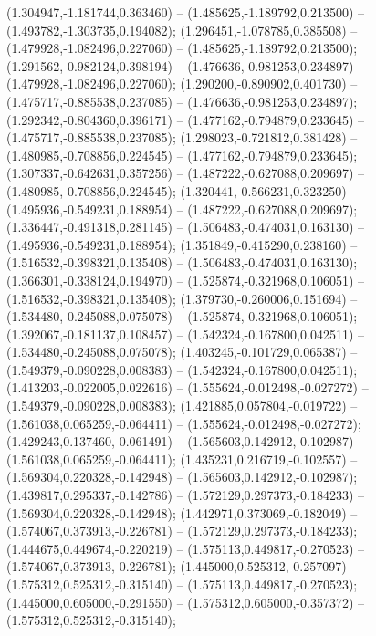  (1.304947,-1.181744,0.363460) -- (1.485625,-1.189792,0.213500) -- (1.493782,-1.303735,0.194082);
 (1.296451,-1.078785,0.385508) -- (1.479928,-1.082496,0.227060) -- (1.485625,-1.189792,0.213500);
 (1.291562,-0.982124,0.398194) -- (1.476636,-0.981253,0.234897) -- (1.479928,-1.082496,0.227060);
 (1.290200,-0.890902,0.401730) -- (1.475717,-0.885538,0.237085) -- (1.476636,-0.981253,0.234897);
 (1.292342,-0.804360,0.396171) -- (1.477162,-0.794879,0.233645) -- (1.475717,-0.885538,0.237085);
 (1.298023,-0.721812,0.381428) -- (1.480985,-0.708856,0.224545) -- (1.477162,-0.794879,0.233645);
 (1.307337,-0.642631,0.357256) -- (1.487222,-0.627088,0.209697) -- (1.480985,-0.708856,0.224545);
 (1.320441,-0.566231,0.323250) -- (1.495936,-0.549231,0.188954) -- (1.487222,-0.627088,0.209697);
 (1.336447,-0.491318,0.281145) -- (1.506483,-0.474031,0.163130) -- (1.495936,-0.549231,0.188954);
 (1.351849,-0.415290,0.238160) -- (1.516532,-0.398321,0.135408) -- (1.506483,-0.474031,0.163130);
 (1.366301,-0.338124,0.194970) -- (1.525874,-0.321968,0.106051) -- (1.516532,-0.398321,0.135408);
 (1.379730,-0.260006,0.151694) -- (1.534480,-0.245088,0.075078) -- (1.525874,-0.321968,0.106051);
 (1.392067,-0.181137,0.108457) -- (1.542324,-0.167800,0.042511) -- (1.534480,-0.245088,0.075078);
 (1.403245,-0.101729,0.065387) -- (1.549379,-0.090228,0.008383) -- (1.542324,-0.167800,0.042511);
 (1.413203,-0.022005,0.022616) -- (1.555624,-0.012498,-0.027272) -- (1.549379,-0.090228,0.008383);
 (1.421885,0.057804,-0.019722) -- (1.561038,0.065259,-0.064411) -- (1.555624,-0.012498,-0.027272);
 (1.429243,0.137460,-0.061491) -- (1.565603,0.142912,-0.102987) -- (1.561038,0.065259,-0.064411);
 (1.435231,0.216719,-0.102557) -- (1.569304,0.220328,-0.142948) -- (1.565603,0.142912,-0.102987);
 (1.439817,0.295337,-0.142786) -- (1.572129,0.297373,-0.184233) -- (1.569304,0.220328,-0.142948);
 (1.442971,0.373069,-0.182049) -- (1.574067,0.373913,-0.226781) -- (1.572129,0.297373,-0.184233);
 (1.444675,0.449674,-0.220219) -- (1.575113,0.449817,-0.270523) -- (1.574067,0.373913,-0.226781);
 (1.445000,0.525312,-0.257097) -- (1.575312,0.525312,-0.315140) -- (1.575113,0.449817,-0.270523);
 (1.445000,0.605000,-0.291550) -- (1.575312,0.605000,-0.357372) -- (1.575312,0.525312,-0.315140);
